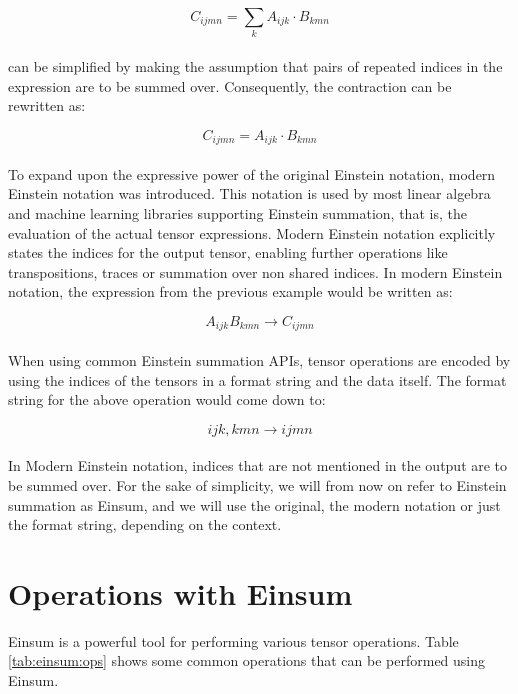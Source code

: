 \[C_{ijmn} = \sum_{k}A_{ijk} \cdot B_{kmn}\]
\noindent
\\
can be simplified by making the assumption that pairs of repeated indices in the expression
are to be summed over. Consequently, the contraction can be rewritten as:

\[C_{ijmn} = A_{ijk} \cdot B_{kmn}\]
\noindent
\\
To expand upon the expressive power of the original Einstein notation, modern Einstein
notation was introduced. This notation is used by most linear algebra and machine
learning libraries supporting Einstein summation, that is, the evaluation of the actual
tensor expressions. Modern Einstein notation explicitly states the indices for the
output tensor, enabling further operations like transpositions, traces or summation
over non shared indices. In modern Einstein notation, the expression from the previous
example would be written as:

\[A_{ijk}B_{kmn} \rightarrow C_{ijmn}\]
\noindent
\\
When using common Einstein summation APIs, tensor operations are encoded by using the
indices of the tensors in a format string and the data itself.
\newpage
\noindent
The format string for the above operation would come down to:

\[ijk,kmn \rightarrow ijmn\]
\noindent
\\
In Modern Einstein notation, indices that are not mentioned in the output are to be
summed over. For the sake of simplicity, we will from now on refer to Einstein summation
as Einsum, and we will use the original, the modern notation or just the format
string, depending on the context.

\section{Operations with Einsum}
Einsum is a powerful tool for performing various tensor operations. Table \ref{tab:einsum:ops} 
shows some common operations that can be performed using Einsum.

